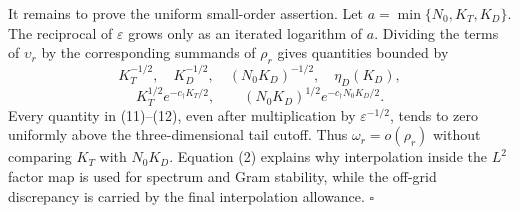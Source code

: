 It remains to prove the uniform small-order assertion. Let \(a=\min\{N_0,K_T,K_D\}\). The reciprocal of \(\varepsilon\) grows only as an iterated logarithm of \(a\). Dividing the terms of \(\upsilon_r\) by the corresponding summands of \(\rho_r\) gives quantities bounded by
\[
 K_T^{-1/2},\quad K_D^{-1/2},\quad (N_0K_D)^{-1/2},\quad
 \eta_D(K_D),                                             \tag{11}
\]
\[
 K_T^{1/2}e^{-c_\dagger K_T/2},\qquad
 (N_0K_D)^{1/2}e^{-c_\dagger N_0K_D/2}.                  \tag{12}
\]
Every quantity in (11)--(12), even after multiplication by \(\varepsilon^{-1/2}\), tends to zero uniformly above the three-dimensional tail cutoff. Thus \(\omega_r=o(\rho_r)\) without comparing \(K_T\) with \(N_0K_D\). Equation (2) explains why interpolation inside the \(L^2\) factor map is used for spectrum and Gram stability, while the off-grid discrepancy is carried by the final interpolation allowance. \(\square\)